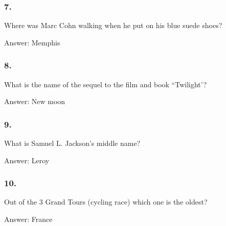 \documentclass{beamer}
\begin{document}
    \begin{frame}
        \frametitle{7.}
        Where was Marc Cohn walking when he put on his blue suede shoes?\\

        \begin{center}
            Answer: Memphis
        \end{center}
    \end{frame}

    \begin{frame}
        \frametitle{8.}
        What is the name of the sequel to the film and book ``Twilight'?\\

        \begin{center}
            Answer: New moon
        \end{center}
    \end{frame}

    \begin{frame}
        \frametitle{9.}
        What is Samuel L. Jackson's middle name?\\

        \begin{center}
            Answer: Leroy
        \end{center}
    \end{frame}

    \begin{frame}
        \frametitle{10.}
        Out of the 3 Grand Tours (cycling race) which one is the oldest?\\

        \begin{center}
            Answer: France
        \end{center}
    \end{frame}
\end{document}
